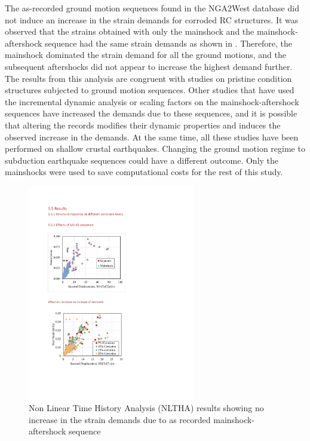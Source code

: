 The as-recorded ground motion sequences found in the NGA2West database \cite{Ancheta2014} did not induce an increase in the strain demands for corroded RC structures. It was observed that the strains obtained with only the mainshock and the mainshock-aftershock sequence had the same strain demands as shown in . Therefore, the mainshock dominated the strain demand for all the ground motions, and the subsequent aftershocks did not appear to increase the highest demand further. The results from this analysis are congruent with studies on pristine condition structures subjected to ground motion sequences. Other studies that have used the incremental dynamic analysis or scaling factors on the mainshock-aftershock sequences have increased the demands due to these sequences, and it is possible that altering the records modifies their dynamic properties and induces the observed increase in the demands. At the same time, all these studies have been performed on shallow crustal earthquakes. Changing the ground motion regime to subduction earthquake sequences could have a different outcome. Only the mainshocks were used to save computational costs for the rest of this study.

\begin{figure}[htbp]
	\centering
	\includegraphics[width=0.65\textwidth]{VAC Thesis 2.0/Chapter-5/figs/MS_AS_results_noincrease_in_demands.pdf}
	\caption{Non Linear Time History Analysis (NLTHA) results showing no increase in the strain demands due to as recorded mainshock-aftershock sequence}
	\label{fig:ms_as_results}
\end{figure}

